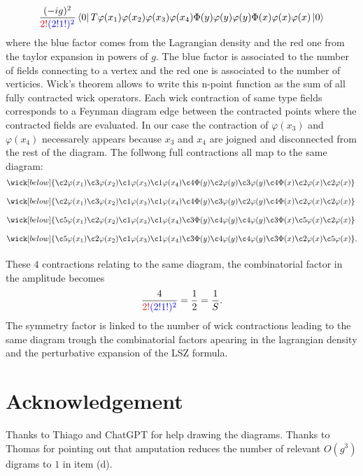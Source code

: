 \documentclass[10pt, a4paper]{article}
\begin{document}
\begin{enumerate}
  \begin{align*}
    \dfrac{(-ig)^2}{\textcolor{red}{2!}\textcolor{blue}{(2!1!)^2}}\bra{0}T \varphi(x_1)\varphi(x_2)\varphi(x_3)\varphi(x_4)\Phi(y) \varphi(y)\varphi(y)\Phi(x) \varphi(x)\varphi(x) \ket{0}
  \end{align*}
  where the blue factor comes from the Lagrangian density and the red one from the taylor expansion in powers of $g$. The blue factor is associated to the number of fields connecting to a vertex and the red one is associated to the number of verticies. Wick's theorem allows to write this n-point function as the sum of all fully contracted wick operators. Each wick contraction of same type fields corresponds to a Feynman diagram edge between the contracted points where the contracted fields are evaluated. In our case the contraction of $\varphi(x_3)$ and $\varphi(x_4)$ necessarely appears because $x_3$ and $x_4$ are joigned and disconnected from the rest of the diagram. The follwong full contractions all map to the same diagram:
  \begin{align*}
    &\wick[below]{\c2\varphi(x_1)\c3\varphi(x_2)\c1\varphi(x_3)\c1\varphi(x_4)\c4\Phi(y) \c2\varphi(y)\c3\varphi(y)\c4\Phi(x) \c2\varphi(x)\c2\varphi(x)}\\[0.3cm]
    &\wick[below]{\c2\varphi(x_1)\c3\varphi(x_2)\c1\varphi(x_3)\c1\varphi(x_4)\c4\Phi(y) \c3\varphi(y)\c2\varphi(y)\c4\Phi(x) \c2\varphi(x)\c2\varphi(x)}\\[0.3cm]
    &\wick[below]{\c5\varphi(x_1)\c2\varphi(x_2)\c1\varphi(x_3)\c1\varphi(x_4)\c3\Phi(y) \c4\varphi(y)\c4\varphi(y)\c3\Phi(x)\c5\varphi(x)\c2\varphi(x)}\\[0.3cm]
    &\wick[below]{\c5\varphi(x_1)\c2\varphi(x_2)\c1\varphi(x_3)\c1\varphi(x_4)\c3\Phi(y) \c4\varphi(y)\c4\varphi(y)\c3\Phi(x)\c2\varphi(x)\c5\varphi(x)}.\\[0.3cm]
  \end{align*}
These $4$ contractions relating to the same diagram, the combinatorial factor in the amplitude becomes 
\begin{align*}
  \dfrac{4}{\textcolor{red}{2!}\textcolor{blue}{(2!1!)^2}} = \dfrac{1}{2} = \dfrac{1}{S}.
\end{align*}
The symmetry factor is linked to the number of wick contractions leading to the same diagram trough the combinatorial factors apearing in the lagrangian density and the perturbative expansion of the LSZ formula. 
\end{enumerate}



\section{Acknowledgement}
Thanks to Thiago and ChatGPT for help drawing the diagrams. Thanks to Thomas for pointing out that amputation reduces the number of relevant $O(g^3)$ digrams to $1$ in item (d).

\makereferences


\end{document}
